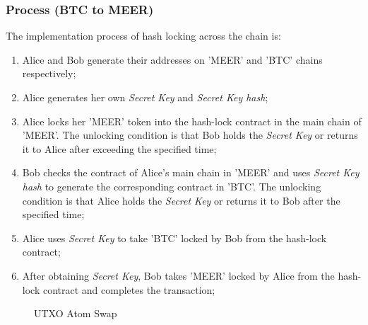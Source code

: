 \documentclass[a4paper,11pt]{article}
\begin{document}
\subsubsection*{Process (BTC to MEER)}

The implementation process of hash locking across the chain is:

\begin{enumerate}
\item  Alice and Bob generate their addresses on 'MEER' and 'BTC' chains respectively;

\item Alice generates her own \textit{Secret Key} and \textit{Secret Key hash};

\item Alice locks her 'MEER' token into the hash-lock contract in the main chain of 'MEER'. The unlocking condition is that Bob holds the \textit{Secret Key} or returns it to Alice after exceeding the specified time;

\item Bob checks the contract of Alice's main chain in 'MEER' and uses \textit{Secret Key hash}   to generate the corresponding contract in 'BTC'. The unlocking condition is that Alice holds the \textit{Secret Key} or returns it to Bob after the specified time;

\item Alice uses \textit{Secret Key}  to take  'BTC' locked by Bob from the hash-lock contract;

\item After obtaining \textit{Secret Key}, Bob  takes 'MEER' locked by Alice from the hash-lock contract and completes the transaction;

\end{enumerate}

\begin{figure}[hbt]
	\centerline{%
	}
\caption{UTXO Atom Swap}
\end{figure}
\end{document}
